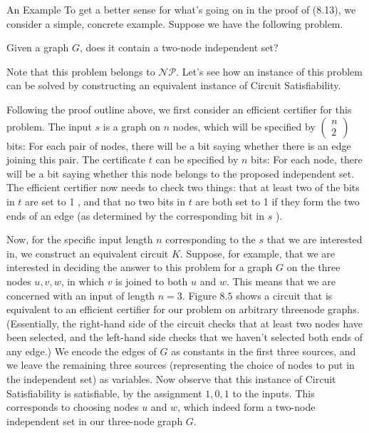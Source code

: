 \documentclass[a4paper, 12pt]{book}
\theoremstyle{dotless}
\begin{document}
An Example To get a better sense for what's going on in the proof of (8.13), we consider a simple, concrete example. Suppose we have the following problem.

Given a graph $G$, does it contain a two-node independent set?

Note that this problem belongs to $\mathcal{N} \mathcal{P}$. Let's see how an instance of this problem can be solved by constructing an equivalent instance of Circuit Satisfiability.

Following the proof outline above, we first consider an efficient certifier for this problem. The input $s$ is a graph on $n$ nodes, which will be specified by $\left(\begin{array}{l}n \\ 2\end{array}\right)$ bits: For each pair of nodes, there will be a bit saying whether there is an edge joining this pair. The certificate $t$ can be specified by $n$ bits: For each node, there will be a bit saying whether this node belongs to the proposed independent set. The efficient certifier now needs to check two things: that at least two of the bits in $t$ are set to 1 , and that no two bits in $t$ are both set to 1 if they form the two ends of an edge (as determined by the corresponding bit in $s$ ).

Now, for the specific input length $n$ corresponding to the $s$ that we are interested in, we construct an equivalent circuit $K$. Suppose, for example, that we are interested in deciding the answer to this problem for a graph $G$ on the three nodes $u, v, w$, in which $v$ is joined to both $u$ and $w$. This means that we are concerned with an input of length $n=3$. Figure $8.5$ shows a circuit that is equivalent to an efficient certifier for our problem on arbitrary threenode graphs. (Essentially, the right-hand side of the circuit checks that at least two nodes have been selected, and the left-hand side checks that we haven't selected both ends of any edge.) We encode the edges of $G$ as constants in the first three sources, and we leave the remaining three sources (representing the choice of nodes to put in the independent set) as variables. Now observe that this instance of Circuit Satisfiability is satisfiable, by the assignment $1,0,1$ to the inputs. This corresponds to choosing nodes $u$ and $w$, which indeed form a two-node independent set in our three-node graph $G$.
\end{document}
